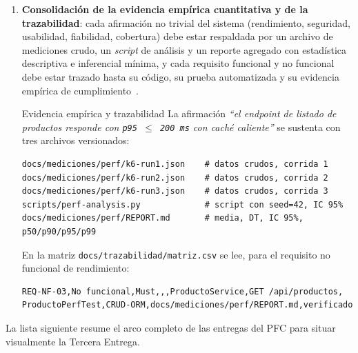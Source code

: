 \documentclass[11pt,a4paper]{article}
\begin{document}
\begin{enumerate}
    \item \textbf{Consolidaci\'{o}n de la evidencia emp\'{i}rica cuantitativa y de la trazabilidad}: cada afirmaci\'{o}n no trivial del sistema (rendimiento, seguridad, usabilidad, fiabilidad, cobertura) debe estar respaldada por un archivo de mediciones crudo, un \emph{script} de an\'{a}lisis y un reporte agregado con estad\'{i}stica descriptiva e inferencial m\'{i}nima, y cada requisito funcional y no funcional debe estar trazado hasta su c\'{o}digo, su prueba automatizada y su evidencia emp\'{i}rica de cumplimiento~\cite{nygard2011adr,brown2023c4,bass2021software,richards2020fundamentals,ralph2021empirical}.

    \begin{cajaejemplo}{Evidencia emp\'{i}rica y trazabilidad}
        La afirmaci\'{o}n \emph{``el \emph{endpoint} de listado de productos responde con \texttt{p95 $\leq$ 200\,ms} con cach\'{e} caliente''} se sustenta con tres archivos versionados:

        \begin{lstlisting}[basicstyle=\ttfamily\scriptsize]
docs/mediciones/perf/k6-run1.json    # datos crudos, corrida 1
docs/mediciones/perf/k6-run2.json    # datos crudos, corrida 2
docs/mediciones/perf/k6-run3.json    # datos crudos, corrida 3
scripts/perf-analysis.py             # script con seed=42, IC 95%
docs/mediciones/perf/REPORT.md       # media, DT, IC 95%, p50/p90/p95/p99
        \end{lstlisting}

        En la matriz \texttt{docs/trazabilidad/matriz.csv} se lee, para el requisito no funcional de rendimiento:

        \begin{lstlisting}[basicstyle=\ttfamily\scriptsize]
REQ-NF-03,No funcional,Must,,,ProductoService,GET /api/productos,
ProductoPerfTest,CRUD-ORM,docs/mediciones/perf/REPORT.md,verificado
        \end{lstlisting}
    \end{cajaejemplo}
\end{enumerate}

La lista siguiente resume el arco completo de las entregas del PFC para situar visualmente la Tercera Entrega.
\end{document}
